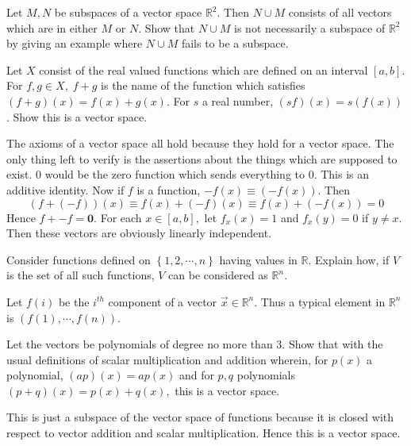 \documentclass{ximera}
\begin{document}
\begin{problem}\label{prb:10.19} Let $M,N$ be subspaces of a vector space $\mathbb{R}^{2}.$ Then $N\cup
M$ consists of all vectors which are in either $M$ or $N$. Show that $N\cup
M $ is not necessarily a subspace of $\mathbb{R}^{2}$ by giving an example
where $N\cup M$ fails to be a subspace.
\end{problem}


\begin{problem}\label{prb:10.20} \label{4julyprob1}Let $X$ consist of the real valued functions which
are defined on an interval $\left[ a,b\right] .$ For $f,g\in X,\;f+g$ is the
name of the function which satisfies $\left( f+g\right) \left( x\right)
=f\left( x\right) +g\left( x\right)$. For $s$ a real number, $
\left( s f\right) \left( x\right) = s \left( f\left( x\right)
\right) $. Show this is a vector space.
\begin{hint}
The axioms of a vector space all hold because they
hold for a vector space. The only thing left to verify is the
assertions about the things which are supposed to exist. $0$ would
be the zero function which sends everything to $0$. This is an additive
identity. Now if $f$ is a function, $-f\left( x\right) \equiv \left(
-f\left( x\right) \right) $. Then
\[
\left( f+\left( -f\right) \right) \left( x\right) \equiv f\left( x\right)
+\left( -f\right) \left( x\right) \equiv f\left( x\right) +\left( -f\left(
x\right) \right) =0
\]
Hence $f+-f=\mathbf{0}$. For each $x\in \left[ a,b\right] ,$ let $%
f_{x}\left( x\right) =1$ and $f_{x}\left( y\right) =0$ if $y\neq x.$ Then
these vectors are obviously linearly independent.
\end{hint}
\end{problem}

\begin{problem}\label{prb:10.21} Consider functions defined on $\left\{ 1,2,\cdots ,n\right\} $ having
values in $\mathbb{R}$. Explain how, if $V$ is the set of all such
functions, $V$ can be considered as $\mathbb{R}^{n}$.
\begin{hint}
Let $f\left( i\right) $ be the $i^{th}$ component of a vector $
\vec{x}\in \mathbb{R}^{n}$. Thus a typical element in $\mathbb{R}^{n}$ is $
\left( f\left( 1\right) ,\cdots ,f\left( n\right) \right) $.
\end{hint}
\end{problem}

\begin{problem}\label{prb:10.22} Let the vectors be polynomials of degree no more than 3. Show that
with the usual definitions of scalar multiplication and addition wherein,
for $p\left( x\right) $ a polynomial, $\left( a p\right) \left(
x\right) = a p\left( x\right) $ and for $p,q$ polynomials $\left(
p+q\right) \left( x\right) =  p\left( x\right) +q\left( x\right) ,$ this
is a vector space.
\begin{hint}
This is just a subspace of the vector space of functions
because it is closed with respect to vector addition and scalar
multiplication. Hence this is a vector space.
\end{hint}
\end{problem}
\end{document}
